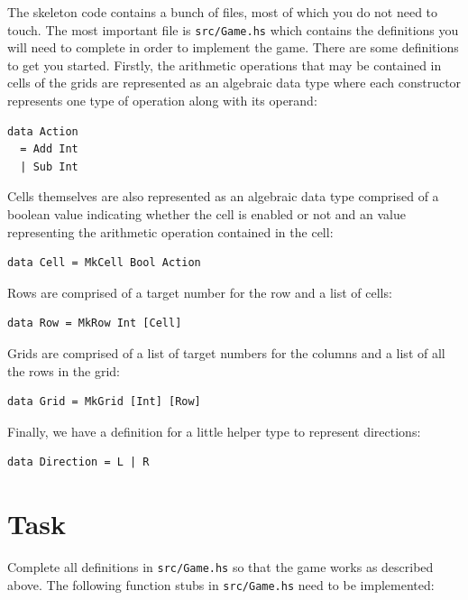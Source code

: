 The skeleton code contains a bunch of files, most of which you do not need to touch. The most important file is \texttt{\small src/Game.hs} which contains the definitions you will need to complete in order to implement the game. There are some definitions to get you started. Firstly, the arithmetic operations that may be contained in cells of the grids are represented as an algebraic data type where each constructor represents one type of operation along with its operand:
\begin{verbatim}
data Action 
  = Add Int 
  | Sub Int 
\end{verbatim}
Cells themselves are also represented as an algebraic data type comprised of a boolean value indicating whether the cell is enabled or not and an  value representing the arithmetic operation contained in the cell:
\begin{verbatim}
data Cell = MkCell Bool Action
\end{verbatim}
Rows are comprised of a target number for the row and a list of cells:
\begin{verbatim}
data Row = MkRow Int [Cell]
\end{verbatim}
Grids are comprised of a list of target numbers for the columns and a list of all the rows in the grid:
\begin{verbatim}
data Grid = MkGrid [Int] [Row]
\end{verbatim}
Finally, we have a definition for a little helper type to represent directions:
\begin{verbatim}
data Direction = L | R
\end{verbatim}


\section{Task}

Complete all definitions in \texttt{\small src/Game.hs} so that the game works as described above. The following function stubs in \texttt{\small src/Game.hs} need to be implemented:

